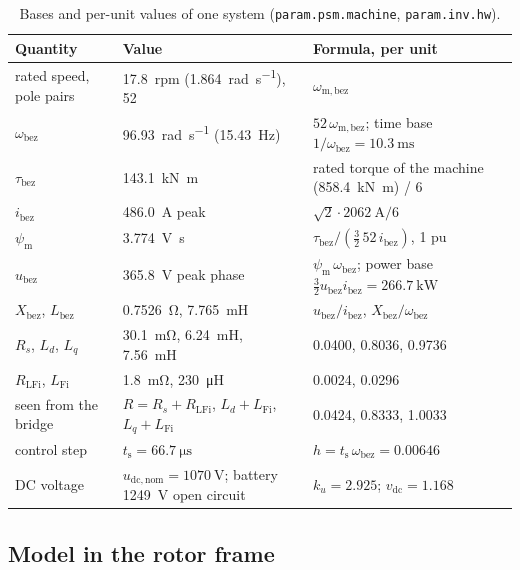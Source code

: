 \documentclass[11pt,a4paper]{scrartcl}
\newcommand{\ped}[1]{_{\mathrm{#1}}}
\newcommand{\code}[1]{\texttt{#1}}
\begin{document}
\begin{onehalfspace}
\begin{table}[H]
	\centering
	\footnotesize
	\caption{Bases and per-unit values of one system (\code{param.psm.machine}, \code{param.inv.hw}).}
	\label{tab:bases}
	\begin{tabularx}{\textwidth}{@{} l l X @{}}
		\toprule
		\textbf{Quantity} & \textbf{Value} & \textbf{Formula, per unit} \\
		\midrule
		rated speed, pole pairs & \SI{17.8}{rpm} (\SI{1.864}{\radian\per\second}), 52 & $\omega\ped{m,bez}$ \\
		$\omega\ped{bez}$ & \SI{96.93}{\radian\per\second} (\SI{15.43}{\hertz}) & $52\,\omega\ped{m,bez}$; time base $1/\omega\ped{bez} = \SI{10.3}{\milli\second}$ \\
		$\tau\ped{bez}$ & \SI{143.1}{\kilo\newton\metre} & rated torque of the machine (\SI{858.4}{\kilo\newton\metre}) / 6 \\
		$i\ped{bez}$ & \SI{486.0}{\ampere} peak & $\sqrt2\cdot\SI{2062}{\ampere}/6$ \\
		$\psi\ped{m}$ & \SI{3.774}{\volt\second} & $\tau\ped{bez}/(\frac32\,52\,i\ped{bez})$, 1 pu \\
		$u\ped{bez}$ & \SI{365.8}{\volt} peak phase & $\psi\ped{m}\,\omega\ped{bez}$; power base $\frac32 u\ped{bez}i\ped{bez} = \SI{266.7}{\kilo\watt}$ \\
		$X\ped{bez}$, $L\ped{bez}$ & \SI{0.7526}{\ohm}, \SI{7.765}{\milli\henry} & $u\ped{bez}/i\ped{bez}$, $X\ped{bez}/\omega\ped{bez}$ \\
		$R_s$, $L_d$, $L_q$ & \SI{30.1}{\milli\ohm}, \SI{6.24}{\milli\henry}, \SI{7.56}{\milli\henry} & 0.0400, 0.8036, 0.9736 \\
		$R\ped{LFi}$, $L\ped{Fi}$ & \SI{1.8}{\milli\ohm}, \SI{230}{\micro\henry} & 0.0024, 0.0296 \\
		seen from the bridge & $R = R_s + R\ped{LFi}$, $L_d + L\ped{Fi}$, $L_q + L\ped{Fi}$ & 0.0424, 0.8333, 1.0033 \\
		control step & $t\ped{s} = \SI{66.7}{\micro\second}$ & $h = t\ped{s}\,\omega\ped{bez} = 0.00646$ \\
		DC voltage & $u\ped{dc,nom} = \SI{1070}{\volt}$; battery \SI{1249}{\volt} open circuit & $k_u = 2.925$; $v\ped{dc} = 1.168$ \\
		\bottomrule
	\end{tabularx}
\end{table}

\subsection{Model in the rotor frame}


\end{onehalfspace}
\end{document}
